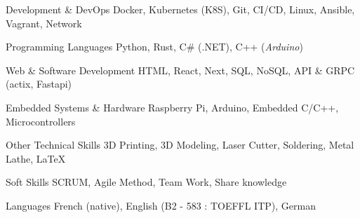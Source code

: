 

\begin{cvskills}

	\cvskill
    {Development \& DevOps} %
    {Docker, Kubernetes (K8S), Git, CI/CD, Linux, Ansible, Vagrant, Network}

	\cvskill
	{Programming Languages} %
    {Python, Rust, C\# (.NET), C++ (\textit{Arduino})} %

    \cvskill
    {Web \& Software Development} %
    {HTML, React, Next, SQL, NoSQL, API \& GRPC (actix, Fastapi)} %

    \cvskill
    {Embedded Systems \& Hardware} %
    {Raspberry Pi, Arduino, Embedded C/C++, Microcontrollers}

	\cvskill
	{Other Technical Skills} %
    {3D Printing, 3D Modeling, Laser Cutter, Soldering, Metal Lathe, LaTeX} %

	\cvskill
	{Soft Skills} %
	{SCRUM, Agile Method, Team Work, Share knowledge} %

	\cvskill
	{Languages} %
	{French (native), English (B2 - 583  : TOEFFL ITP), German} %

\end{cvskills}
